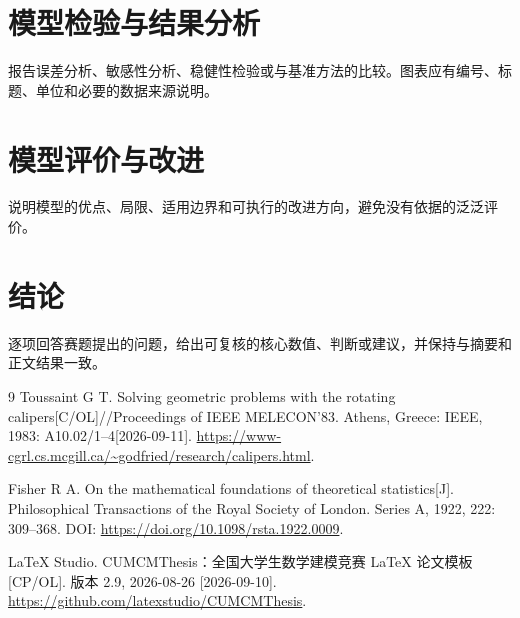 \documentclass[withoutpreface,bwprint]{cumcmthesis}
\begin{document}
\section{模型检验与结果分析}

报告误差分析、敏感性分析、稳健性检验或与基准方法的比较。图表应有编号、标题、单位和必要的数据来源说明。

\section{模型评价与改进}

说明模型的优点、局限、适用边界和可执行的改进方向，避免没有依据的泛泛评价。

\section{结论}

逐项回答赛题提出的问题，给出可复核的核心数值、判断或建议，并保持与摘要和正文结果一致。


\begin{thebibliography}{9}
  Toussaint G T.
  \newblock Solving geometric problems with the rotating calipers[C/OL]//Proceedings of IEEE MELECON'83.
  \newblock Athens, Greece: IEEE, 1983: A10.02/1--4[2026-09-11].
  \newblock \url{https://www-cgrl.cs.mcgill.ca/~godfried/research/calipers.html}.

  Fisher R A.
  \newblock On the mathematical foundations of theoretical statistics[J].
  \newblock Philosophical Transactions of the Royal Society of London. Series A,
  1922, 222: 309--368. DOI: \url{https://doi.org/10.1098/rsta.1922.0009}.

  LaTeX Studio.
  \newblock CUMCMThesis：全国大学生数学建模竞赛 \LaTeX{} 论文模板[CP/OL].
  \newblock 版本 2.9, 2026-08-26 [2026-09-10]. \url{https://github.com/latexstudio/CUMCMThesis}.

\end{thebibliography}
\end{document}
